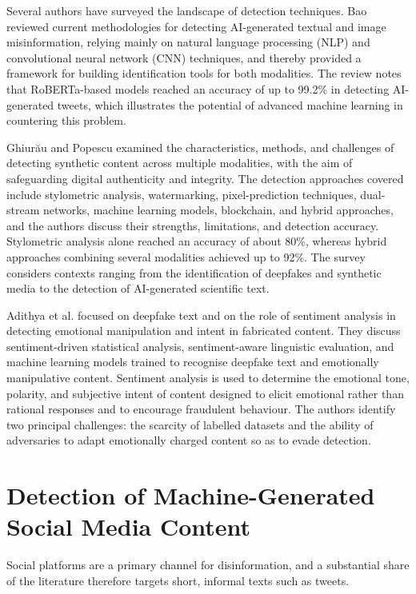 Several authors have surveyed the landscape of detection techniques. Bao \cite{bao2024} reviewed current methodologies for detecting AI-generated textual and image misinformation, relying mainly on natural language processing (NLP) and convolutional neural network (CNN) techniques, and thereby provided a framework for building identification tools for both modalities. The review notes that RoBERTa-based models reached an accuracy of up to 99.2\% in detecting AI-generated tweets, which illustrates the potential of advanced machine learning in countering this problem.

Ghiur\u{a}u and Popescu \cite{ghiurau2025} examined the characteristics, methods, and challenges of detecting synthetic content across multiple modalities, with the aim of safeguarding digital authenticity and integrity. The detection approaches covered include stylometric analysis, watermarking, pixel-prediction techniques, dual-stream networks, machine learning models, blockchain, and hybrid approaches, and the authors discuss their strengths, limitations, and detection accuracy. Stylometric analysis alone reached an accuracy of about 80\%, whereas hybrid approaches combining several modalities achieved up to 92\%. The survey considers contexts ranging from the identification of deepfakes and synthetic media to the detection of AI-generated scientific text.

Adithya et al. \cite{adithya2025} focused on deepfake text and on the role of sentiment analysis in detecting emotional manipulation and intent in fabricated content. They discuss sentiment-driven statistical analysis, sentiment-aware linguistic evaluation, and machine learning models trained to recognise deepfake text and emotionally manipulative content. Sentiment analysis is used to determine the emotional tone, polarity, and subjective intent of content designed to elicit emotional rather than rational responses and to encourage fraudulent behaviour. The authors identify two principal challenges: the scarcity of labelled datasets and the ability of adversaries to adapt emotionally charged content so as to evade detection.

\section{Detection of Machine-Generated Social Media Content}
\label{sec:lr_social}

Social platforms are a primary channel for disinformation, and a substantial share of the literature therefore targets short, informal texts such as tweets.

